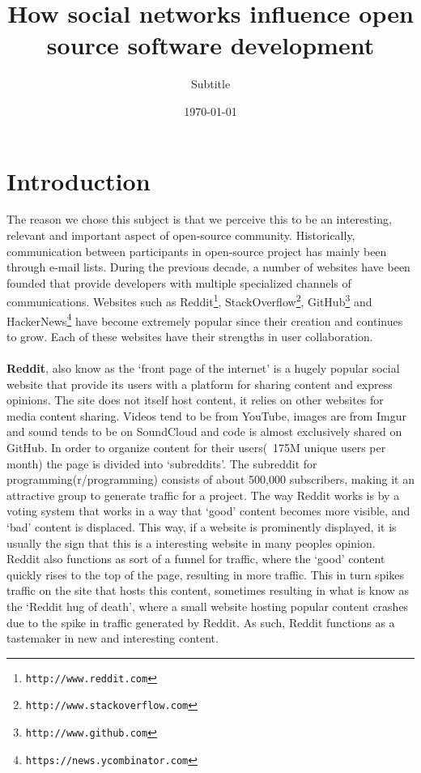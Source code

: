 \documentclass[a4paper,11pt]{scrartcl}
\title{How social networks influence open source software development}
\subtitle{Subtitle}
\date{\today}
\begin{document}
\maketitle

\section{Introduction}

The reason we chose this subject is that we perceive this to be an interesting, relevant and important aspect of open-source community. Historically, communication between participants in open-source project has mainly been through e-mail lists. During the previous decade, a number of websites have been founded that provide developers with multiple specialized channels of communications. Websites such as  Reddit\footnote{\texttt{http://www.reddit.com}}, StackOverflow\footnote{\texttt{http://www.stackoverflow.com}}, GitHub\footnote{\texttt{http://www.github.com}} and HackerNews\footnote{\texttt{https://news.ycombinator.com}} have become extremely popular since their creation and continues to grow. Each of these websites have their strengths in user collaboration. 
\\\\
\textbf{Reddit}, also know as the ‘front page of the internet’ is a hugely popular social website that provide its users with a platform for sharing content and express opinions. The site does not itself host content, it relies on other websites for media content sharing. Videos tend to be from YouTube, images are from Imgur and sound tends to be on SoundCloud and code is almost exclusively shared on GitHub. In order to organize content for their users(~175M unique users per month) the page is divided into ‘subreddits’. The subreddit for programming(r/programming) consists of about 500,000 subscribers, making it an attractive group to generate traffic for a project. The way Reddit works is by a voting system that works in a way that ‘good’ content becomes more visible, and ‘bad’ content is displaced. This way, if a website is prominently displayed, it is usually the sign that this is a interesting website in many peoples opinion.
\\
Reddit also functions as sort of a funnel for traffic, where the ‘good’ content quickly rises to the top of the page, resulting in more traffic. This in turn spikes traffic on the site that hosts this content, sometimes resulting in what is know as the ‘Reddit hug of death’, where a small website hosting popular content crashes due to the spike in traffic generated by Reddit. As such, Reddit functions as a tastemaker in new and interesting content. 
\end{document}
